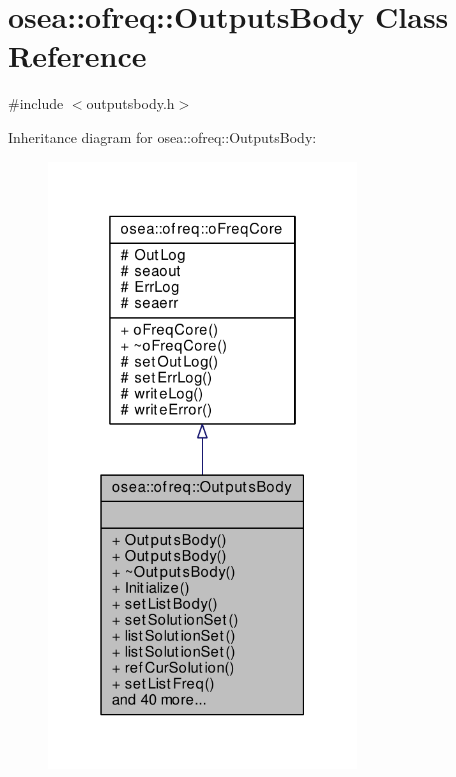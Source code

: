 \hypertarget{classosea_1_1ofreq_1_1_outputs_body}{\section{osea\-:\-:ofreq\-:\-:Outputs\-Body Class Reference}
\label{classosea_1_1ofreq_1_1_outputs_body}
}


{\ttfamily \#include $<$outputsbody.\-h$>$}



Inheritance diagram for osea\-:\-:ofreq\-:\-:Outputs\-Body\-:
\nopagebreak
\begin{figure}[H]
\begin{center}
\leavevmode
\includegraphics[width=232pt]{classosea_1_1ofreq_1_1_outputs_body__inherit__graph}
\end{center}
\end{figure}
